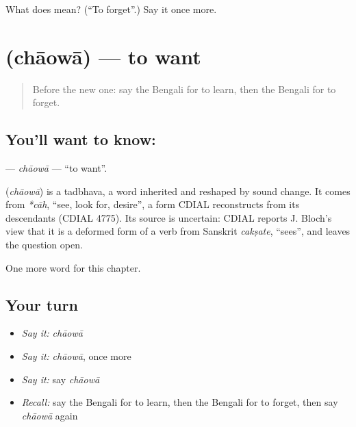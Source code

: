 \begin{tcolorbox}[breakable,colback=teal!4,colframe=teal!35!black,title={Before you move on}]
What does  mean? (\textquotedblleft{}To forget\textquotedblright{}.) Say it once more.
\end{tcolorbox}
\section[\texorpdfstring{\bn{চাওয়া} (chāowā)}{চাওয়া (chāowā)}]{ (chāowā) — to want}

\label{lesson:BN-C51-chaowa}



\begin{quote}
Before the new one: say the Bengali for to learn, then the Bengali for to forget.
\end{quote}

\subsection*{You'll want to know: }
\textbf{} — \emph{chāowā} — \textquotedblleft{}to want\textquotedblright{}.

\begin{cousinweb}
\textbf{} (\emph{chāowā}) is a tadbhava, a word inherited and reshaped by sound change. It comes from \emph{*cāh}, \textquotedblleft{}see, look for, desire\textquotedblright{}, a form CDIAL reconstructs from its descendants (CDIAL 4775). Its source is uncertain: CDIAL reports J. Bloch's view that it is a deformed form of a verb from Sanskrit \emph{cakṣate}, \textquotedblleft{}sees\textquotedblright{}, and leaves the question open.
\end{cousinweb}

\begin{grammarlens}[title={What you've built}]
One more word for this chapter.
\end{grammarlens}

\subsection*{Your turn}
\begin{itemize}
\raggedright
  \item \emph{Say it:} \emph{chāowā}
  \item \emph{Say it:} \emph{chāowā}, once more
  \item \emph{Say it:} say \emph{chāowā}
  \item \emph{Recall:} say the Bengali for to learn, then the Bengali for to forget, then say \emph{chāowā} again
\end{itemize}

